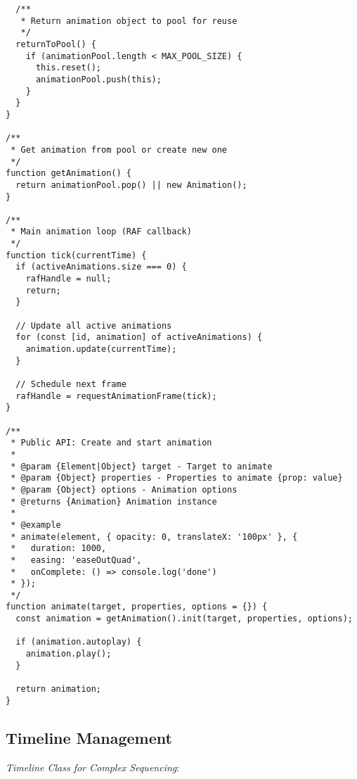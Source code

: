 \documentclass[11pt]{article}
\begin{document}
\begin{verbatim}
  /**
   * Return animation object to pool for reuse
   */
  returnToPool() {
    if (animationPool.length < MAX_POOL_SIZE) {
      this.reset();
      animationPool.push(this);
    }
  }
}

/**
 * Get animation from pool or create new one
 */
function getAnimation() {
  return animationPool.pop() || new Animation();
}

/**
 * Main animation loop (RAF callback)
 */
function tick(currentTime) {
  if (activeAnimations.size === 0) {
    rafHandle = null;
    return;
  }
  
  // Update all active animations
  for (const [id, animation] of activeAnimations) {
    animation.update(currentTime);
  }
  
  // Schedule next frame
  rafHandle = requestAnimationFrame(tick);
}

/**
 * Public API: Create and start animation
 * 
 * @param {Element|Object} target - Target to animate
 * @param {Object} properties - Properties to animate {prop: value}
 * @param {Object} options - Animation options
 * @returns {Animation} Animation instance
 * 
 * @example
 * animate(element, { opacity: 0, translateX: '100px' }, {
 *   duration: 1000,
 *   easing: 'easeOutQuad',
 *   onComplete: () => console.log('done')
 * });
 */
function animate(target, properties, options = {}) {
  const animation = getAnimation().init(target, properties, options);
  
  if (animation.autoplay) {
    animation.play();
  }
  
  return animation;
}
\end{verbatim}
\subsection{Timeline Management}
\label{sec:org8432f9b}

\emph{Timeline Class for Complex Sequencing}:
\end{document}
